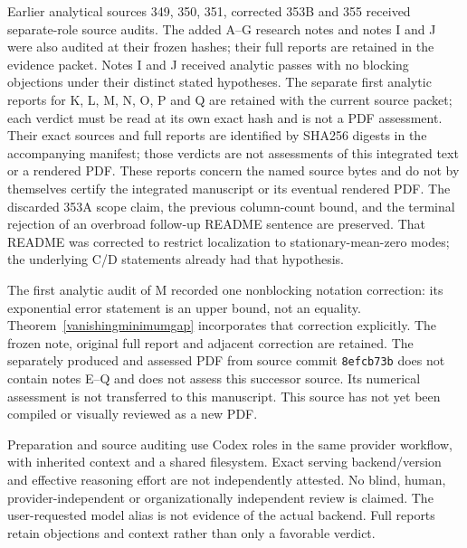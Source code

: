 \documentclass[11pt]{article}
\begin{document}
Earlier analytical sources 349, 350, 351, corrected 353B and 355 received separate-role source audits. The added A--G research notes and notes I and J were also audited at their frozen hashes; their full reports are retained in the evidence packet. Notes I and J received analytic passes with no blocking objections under their distinct stated hypotheses. The separate first analytic reports for K, L, M, N, O, P and Q are retained with the current source packet; each verdict must be read at its own exact hash and is not a PDF assessment. Their exact sources and full reports are identified by SHA256 digests in the accompanying manifest; those verdicts are not assessments of this integrated text or a rendered PDF. These reports concern the named source bytes and do not by themselves certify the integrated manuscript or its eventual rendered PDF. The discarded 353A scope claim, the previous column-count bound, and the terminal rejection of an overbroad follow-up README sentence are preserved. That README was corrected to restrict localization to stationary-mean-zero modes; the underlying C/D statements already had that hypothesis.

The first analytic audit of M recorded one nonblocking notation correction:
its exponential error statement is an upper bound, not an equality.
Theorem~\ref{vanishingminimumgap} incorporates that correction explicitly.
The frozen note, original full report and adjacent correction are retained.
The separately produced and assessed PDF from source commit \texttt{8efcb73b}
does not contain notes E--Q and does not assess this successor source.
Its numerical assessment is not transferred to this manuscript. This source
has not yet been compiled or visually reviewed as a new PDF.

Preparation and source auditing use Codex roles in the same provider workflow, with inherited context and a shared filesystem. Exact serving backend/version and effective reasoning effort are not independently attested. No blind, human, provider-independent or organizationally independent review is claimed. The user-requested model alias is not evidence of the actual backend. Full reports retain objections and context rather than only a favorable verdict.
\end{document}
